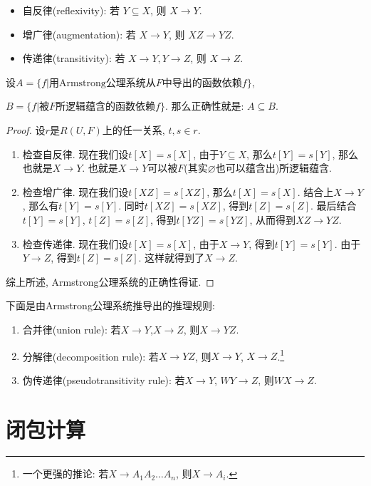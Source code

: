 \begin{theorem}[Armstrong公理系统]
  \begin{itemize}
    \item 自反律(reflexivity): 若 $Y \subseteq X$, 则 $X \rightarrow Y$.
    \item 增广律(augmentation): 若 $X \rightarrow Y$, 则 $XZ \rightarrow YZ$.
    \item 传递律(transitivity): 若 $X \rightarrow Y, Y \rightarrow Z$, 则 $X \rightarrow Z$.
  \end{itemize}
\end{theorem}

\begin{theorem}[正确性]
  设$A=\{f|\text{用Armstrong公理系统从}F\text{中导出的函数依赖}f\}$, 
  
  $B=\{f|\text{被}F\text{所逻辑蕴含的函数依赖}f\}$. 那么正确性就是: $A\subseteq B$.
\end{theorem}

\begin{proof}
  设$r$是$R(U,F)$上的任一关系, $t,s\in r$.
  \begin{enumerate}
      \item 检查自反律. 现在我们设$t[X]=s[X]$, 由于$Y\subseteq X$, 那么$t[Y]=s[Y]$, 那么也就是$X\to Y$. 也就是$X\to Y$可以被$F$(其实$\varnothing$也可以蕴含出)所逻辑蕴含.
      \item 检查增广律. 现在我们设$t[XZ]=s[XZ]$, 那么$t[X]=s[X]$. 结合上$X\to Y$, 那么有$t[Y]=s[Y]$. 同时$t[XZ]=s[XZ]$, 得到$t[Z]=s[Z]$. 最后结合$t[Y]=s[Y]$, $t[Z]=s[Z]$, 得到$t[YZ]=s[YZ]$, 从而得到$XZ\to YZ$.
      \item 检查传递律. 现在我们设$t[X]=s[X]$, 由于$X\to Y$, 得到$t[Y]=s[Y]$. 由于$Y\to Z$, 得到$t[Z]=s[Z]$. 这样就得到了$X\to Z$.
  \end{enumerate}
  综上所述, Armstrong公理系统的正确性得证.
\end{proof}

下面是由Armstrong公理系统推导出的推理规则:
\begin{enumerate}
    \item 合并律(union rule): 若$X\to Y$,$X\to Z$, 则$X\to YZ$.
    \item 分解律(decomposition rule): 若$X\to YZ$, 则$X\to Y$, $X\to Z$.\footnote{一个更强的推论: 若$X\to A_1 A_2 \dots A_n$, 则$X\to A_i$.}
    \item 伪传递律(pseudotransitivity rule): 若$X\to Y$, $WY\to Z$, 则$WX\to Z$.
\end{enumerate}

\section{闭包计算}

